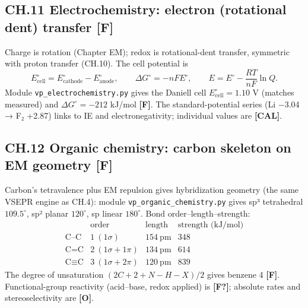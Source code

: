 \documentclass[
  10pt,
]{article}
\begin{document}
\hypertarget{ch.11-electrochemistry-electron-rotational-dent-transfer-f}{%
\subsection{\texorpdfstring{CH.11 Electrochemistry: electron (rotational
dent) transfer
\textbf{{[}F{]}}}{CH.11 Electrochemistry: electron (rotational dent) transfer {[}F{]}}}\label{ch.11-electrochemistry-electron-rotational-dent-transfer-f}}

Charge is rotation (Chapter EM); redox is rotational-dent transfer,
symmetric with proton transfer (CH.10). The cell potential is
\[ E^\circ_{\text{cell}} = E^\circ_{\text{cathode}} - E^\circ_{\text{anode}}, \qquad
   \Delta G^\circ = -nFE^\circ,\qquad E = E^\circ - \frac{RT}{nF}\ln Q. \]
Module \texttt{vp\_electrochemistry.py} gives the Daniell cell
\(E^\circ_{\text{cell}} = 1.10\) V (matches measured) and
\(\Delta G^\circ = -212\) kJ/mol \textbf{{[}F{]}}. The
standard-potential series (Li −3.04 → F₂ +2.87) links to IE and
electronegativity; individual values are \textbf{{[}CAL{]}}.

\hypertarget{ch.12-organic-chemistry-carbon-skeleton-on-em-geometry-f}{%
\subsection{\texorpdfstring{CH.12 Organic chemistry: carbon skeleton on
EM geometry
\textbf{{[}F{]}}}{CH.12 Organic chemistry: carbon skeleton on EM geometry {[}F{]}}}\label{ch.12-organic-chemistry-carbon-skeleton-on-em-geometry-f}}

Carbon's tetravalence plus EM repulsion gives hybridization geometry
(the same VSEPR engine as CH.4): module
\texttt{vp\_organic\_chemistry.py} gives sp³ tetrahedral
\(109.5^\circ\), sp² planar \(120^\circ\), sp linear \(180^\circ\). Bond
order--length--strength: \[
\begin{array}{lccc}
 & \text{order} & \text{length} & \text{strength (kJ/mol)}\\
\text{C–C} & 1\ (1\sigma) & 154\ \text{pm} & 348\\
\text{C=C} & 2\ (1\sigma+1\pi) & 134\ \text{pm} & 614\\
\text{C≡C} & 3\ (1\sigma+2\pi) & 120\ \text{pm} & 839
\end{array}
\] The degree of unsaturation \((2C+2+N-H-X)/2\) gives benzene 4
\textbf{{[}F{]}}. Functional-group reactivity (acid--base, redox
applied) is \textbf{{[}F?{]}}; absolute rates and stereoselectivity are
\textbf{{[}O{]}}.
\end{document}
